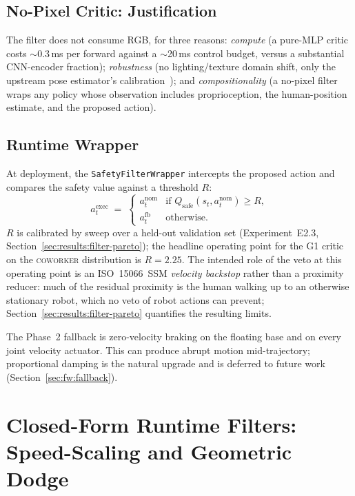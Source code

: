 \documentclass[11pt,a4paper]{report}
\newcommand{\ssm}{SSM}
\newcommand{\iso}{ISO~15066}
\newcommand{\coworker}{\textsc{coworker}}
\begin{document}
\subsection{No-Pixel Critic: Justification}
\label{sec:method:filter:nopixels}

The filter does not consume RGB, for three reasons: \emph{compute}
(a pure-MLP critic costs $\sim$0.3\,ms per forward against a
$\sim$20\,ms control budget, versus a substantial CNN-encoder
fraction); \emph{robustness} (no lighting/texture domain shift, only
the upstream pose estimator's
calibration~\cite{henning2023bodyslampp}); and
\emph{compositionality} (a no-pixel filter wraps any policy whose
observation includes proprioception, the human-position estimate,
and the proposed action).

\subsection{Runtime Wrapper}
\label{sec:method:filter:runtime}

At deployment, the \texttt{SafetyFilterWrapper} intercepts the
proposed action and compares the safety value against a threshold
$R$:
\begin{equation}
  a^{\mathrm{exec}}_t \;=\;
  \begin{cases}
    a^{\mathrm{nom}}_t   & \text{if } Q_{\mathrm{safe}}(s_t, a^{\mathrm{nom}}_t) \ge R, \\
    a^{\mathrm{fb}}_t    & \text{otherwise.}
  \end{cases}
  \label{eq:filter-rule}
\end{equation}
$R$ is calibrated by sweep over a held-out validation set
(Experiment~E2.3, Section~\ref{sec:results:filter-pareto}); the
headline operating point for the G1 critic on the \coworker{}
distribution is $R = 2.25$. The intended role of the veto at this
operating point is an \iso{}~\ssm{} \emph{velocity backstop} rather
than a proximity reducer: much of the residual proximity is the
human walking up to an otherwise stationary robot, which no veto of
robot actions can prevent; Section~\ref{sec:results:filter-pareto}
quantifies the resulting limits.

The Phase~2 fallback is zero-velocity braking on the floating base
and on every joint velocity actuator. This can produce abrupt
motion mid-trajectory; proportional damping is the natural upgrade
and is deferred to future work (Section~\ref{sec:fw:fallback}).

\section{Closed-Form Runtime Filters: Speed-Scaling and Geometric Dodge}
\label{sec:method:filter:closedform}
\end{document}
